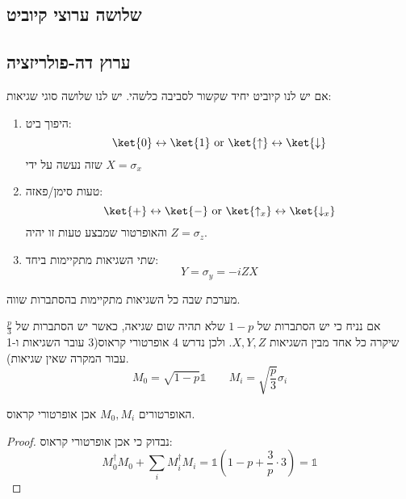 \documentclass{tstextbook}
\begin{document}
\subsection{שלושה ערוצי קיוביט}

\subsection{ערוץ דה-פולריזציה}

\begin{definition}
אם יש לנו קיוביט יחיד שקשור לסביבה כלשהי. יש לנו שלושה סוגי שגיאות:

  \begin{enumerate}
    \item היפוך ביט: 
$$\ket{0} \leftrightarrow  \ket{1}  \text{ or } \ket{\uparrow } \leftrightarrow  \ket{ \downarrow }  $$
שזה נעשה על ידי \(X=\sigma_{x}\)


    \item טעות סימן/פאזה: 
$$\ket{+} \leftrightarrow  \ket{-} \text{ or } \ket{\uparrow _{x}} \leftrightarrow  \ket{\downarrow _{x}} $$
והאופרטור שמבצע טעות זו יהיה \(Z=\sigma_{z}\).


    \item שתי השגיאות מתקיימות ביחד: 
$$Y=\sigma _{y}=-iZX$$


  \end{enumerate}
\end{definition}
\begin{definition}
מערכת שבה כל השגיאות מתקיימות בהסתברות שווה.

\end{definition}
\begin{proposition}
אם נניח כי יש הסתברות של \(1-p\) שלא תהיה שום שגיאה, כאשר יש הסתברות של \(\frac{p}{3}\) שיקרה כל אחד מבין השגיאות \(X,Y,Z\). ולכן נדרש 4 אופרטורי קראוס(3 עובר השגיאות ו-1 עבור המקרה שאין שגיאות).
$$M_{0}=\sqrt{ 1-p }\mathbb{1}  \qquad M_{i}=\sqrt{ \frac{p}{3} } \sigma_{i}
$$

\end{proposition}
\begin{proposition}
האופרטורים \(M_{0},M_{i}\) אכן אופרטורי קראוס.

\end{proposition}
\begin{proof}
נבדוק כי אכן אופרטורי קראוס:
$$M_{0}^{\dagger}M_{0}+\sum_{i}M_{i}^{\dagger} M_{i} = \mathbb{1} \left( 1-p+\frac{3}{p}\cdot 3 \right)=\mathbb{1} $$

\end{proof}
\end{document}
